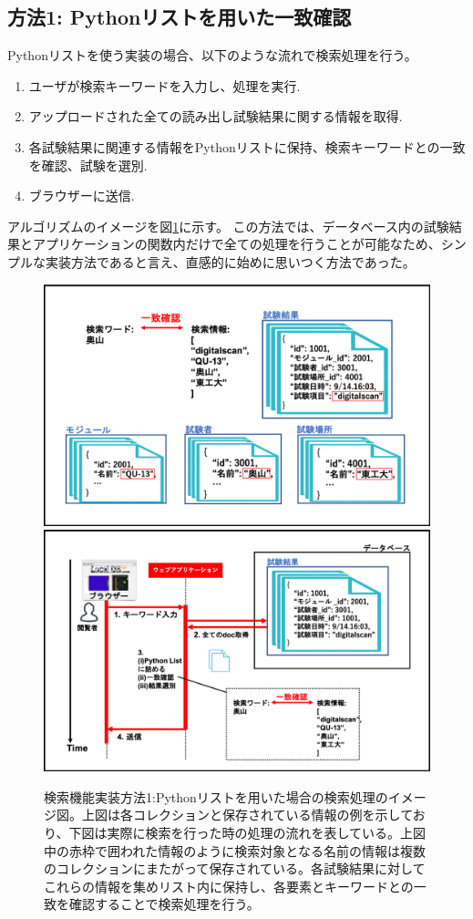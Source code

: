 \subsection{方法1: Pythonリストを用いた一致確認}
Pythonリストを使う実装の場合、以下のような流れで検索処理を行う。
\begin{enumerate}
  \item ユーザが検索キーワードを入力し、処理を実行.
  \item アップロードされた全ての読み出し試験結果に関する情報を取得.
  \item 各試験結果に関連する情報をPythonリストに保持、検索キーワードとの一致を確認、試験を選別.
  \item ブラウザーに送信.
\end{enumerate}

アルゴリズムのイメージを図\ref{search_python_list}に示す。
この方法では、データベース内の試験結果とアプリケーションの関数内だけで全ての処理を行うことが可能なため、シンプルな実装方法であると言え、直感的に始めに思いつく方法であった。

\begin{figure}[bpt]
  \begin{center}
    \includegraphics[width=12cm]{search_python_list}
    \includegraphics[width=12cm]{search_python_list_flow}
  \caption[検索機能実装方法1:Pythonリストを用いた場合]
{検索機能実装方法1:Pythonリストを用いた場合の検索処理のイメージ図。上図は各コレクションと保存されている情報の例を示しており、下図は実際に検索を行った時の処理の流れを表している。上図中の赤枠で囲われた情報のように検索対象となる名前の情報は複数のコレクションにまたがって保存されている。各試験結果に対してこれらの情報を集めリスト内に保持し、各要素とキーワードとの一致を確認することで検索処理を行う。}
  \label{search_python_list}
  \end{center}
\end{figure}

